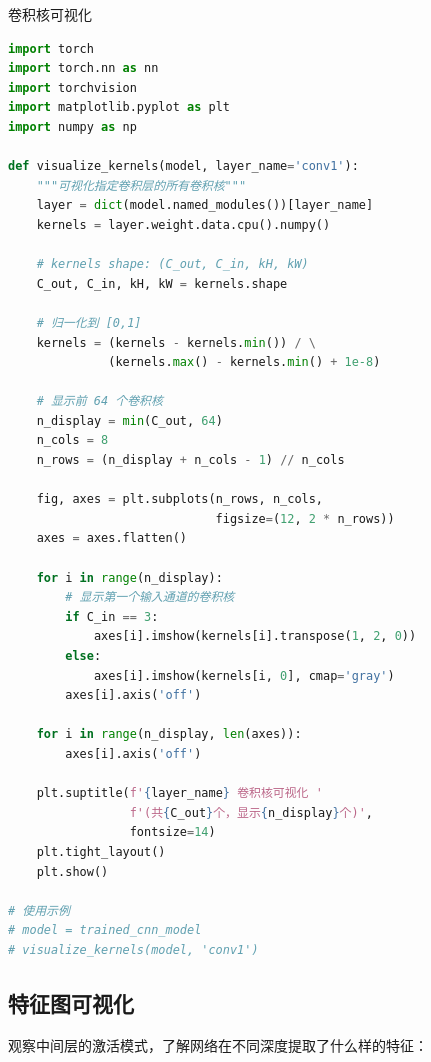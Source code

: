 \begin{mycode}{卷积核可视化}
\begin{lstlisting}[language=Python]
import torch
import torch.nn as nn
import torchvision
import matplotlib.pyplot as plt
import numpy as np

def visualize_kernels(model, layer_name='conv1'):
    """可视化指定卷积层的所有卷积核"""
    layer = dict(model.named_modules())[layer_name]
    kernels = layer.weight.data.cpu().numpy()

    # kernels shape: (C_out, C_in, kH, kW)
    C_out, C_in, kH, kW = kernels.shape

    # 归一化到 [0,1]
    kernels = (kernels - kernels.min()) / \
              (kernels.max() - kernels.min() + 1e-8)

    # 显示前 64 个卷积核
    n_display = min(C_out, 64)
    n_cols = 8
    n_rows = (n_display + n_cols - 1) // n_cols

    fig, axes = plt.subplots(n_rows, n_cols,
                             figsize=(12, 2 * n_rows))
    axes = axes.flatten()

    for i in range(n_display):
        # 显示第一个输入通道的卷积核
        if C_in == 3:
            axes[i].imshow(kernels[i].transpose(1, 2, 0))
        else:
            axes[i].imshow(kernels[i, 0], cmap='gray')
        axes[i].axis('off')

    for i in range(n_display, len(axes)):
        axes[i].axis('off')

    plt.suptitle(f'{layer_name} 卷积核可视化 '
                 f'(共{C_out}个，显示{n_display}个)',
                 fontsize=14)
    plt.tight_layout()
    plt.show()

# 使用示例
# model = trained_cnn_model
# visualize_kernels(model, 'conv1')
\end{lstlisting}
\end{mycode}

\subsection{特征图可视化}

观察中间层的激活模式，了解网络在不同深度提取了什么样的特征：

